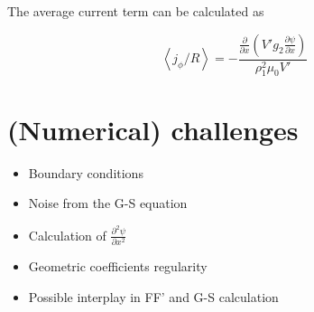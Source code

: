 The average current term can be calculated as

\[\left\langle {{j_\phi }/R} \right\rangle  =  - \frac{{\frac{\partial }{{\partial x}}\left( {V'{g_2}\frac{{\partial \psi }}{{\partial x}}} \right)}}{{\rho _1^2{\mu _0}V'}}\]






\section{(Numerical) challenges}

\begin{itemize}
\item Boundary conditions
\item Noise from the G-S equation
\item Calculation of $\frac{{{\partial ^2}\psi }}{{\partial {x^2}}}$
\item Geometric coefficients regularity
\item Possible interplay in FF' and G-S calculation
\end{itemize}
